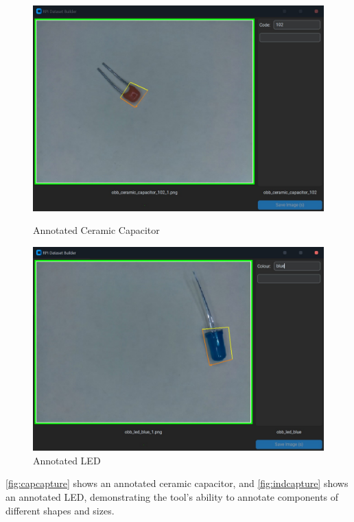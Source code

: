 \begin{figure}[H]
    \hfill
    \begin{minipage}[t]{0.45\textwidth}
      \centering
      \includegraphics[width=\columnwidth]{imgs/python/capcapture.jpg}
      \caption{Annotated Ceramic Capacitor}
      \label{fig:capcapture}
    \end{minipage}
    \hfill
    \begin{minipage}[t]{0.45\textwidth}
      \centering
      \includegraphics[width=\columnwidth]{imgs/python/ledcapture.jpg}
      \caption{Annotated LED}
      \label{fig:indcapture}
    \end{minipage}
    \hfill
\end{figure}

\autoref{fig:capcapture} shows an annotated ceramic capacitor, and \autoref{fig:indcapture} shows an annotated LED, demonstrating the tool's ability to annotate components of different shapes and sizes.


